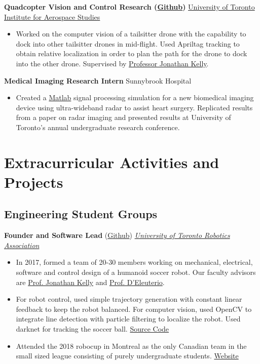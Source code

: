 \documentclass[10pt, a4paper]{cv}
\begin{document}
	\textbf{Quadcopter Vision and Control Research (\href{https://github.com/utiasSTARS/hummingbird_ws}{Github})} \hfill \href{http://www.starslab.ca}{University of Toronto Institute for Aerospace Studies}
	\begin{itemize}
		\item Worked on the computer vision of a tailsitter drone with the capability to dock into other tailsitter drones in mid-flight. Used Apriltag tracking to obtain relative localization in order to plan the path for the drone to dock into the other drone. Supervised by \href{http://stars.utias.utoronto.ca/~jkelly/}{Professor Jonathan Kelly}.
	\end{itemize}

	\textbf{Medical Imaging Research Intern} \hfill Sunnybrook Hospital
	\begin{itemize}
		\item Created a \href{https://github.com/Vuwij/CPRadar}{Matlab} signal processing simulation for a new biomedical imaging device using ultra-wideband radar to assist heart surgery. Replicated results from a paper on radar imaging and presented results at University of Toronto's annual undergraduate research conference.
	\end{itemize}

\section*{Extracurricular Activities and Projects}

\subsection*{Engineering Student Groups}\noindent

	\textbf{Founder and Software Lead} (\href{https://github.com/utra-robosoccer/soccer_ws} {Github}) \hfill \emph{\href{http://www.utrahumanoid.ca}{University of Toronto Robotics Association}}
	\begin{itemize}
		\item In 2017, formed a team of 20-30 members working on mechanical, electrical, software and control design of a humanoid soccer robot. Our faculty advisors are \href{http://stars.utias.utoronto.ca/~jkelly/}{Prof. Jonathan Kelly} and \href{http://www.utias.utoronto.ca/research/space-robotics/}{Prof. D’Eleuterio}.
		\item For robot control, used simple trajectory generation with constant linear feedback to keep the robot balanced. For computer vision, used OpenCV to integrate line detection with particle filtering to localize the robot. Used darknet for tracking the soccer ball. \href{https://github.com/utra-robosoccer/soccer_ws}{Source Code}
		\item Attended the 2018 robocup in Montreal as the only Canadian team in the small sized league consisting of purely undergraduate students. \href{http://utrahumanoid.ca}{Website}
	\end{itemize}
	
\end{document}
